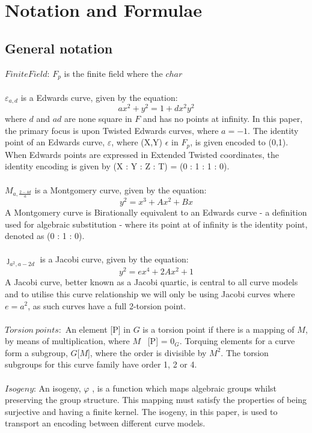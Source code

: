 \documentclass{article}
\begin{document}
\section{Notation and Formulae} 
\subsection{General notation}
$Finite Field$: $F_p$ is the finite field where the $char$ \\\\
$\varepsilon_{a,d}$ is a Edwards curve, given by the equation: $$ {a}x^2+y^2=1+{d}x^2y^2 $$ where {$d$} and {$ad$} are none square in $F$ and has no points at infinity. In this paper, the primary focus is upon Twisted Edwards curves, where $a = -1$. The identity point of an Edwards curve, $\varepsilon$, where (X,Y) $\epsilon$ in $F_p$, is given encoded to (0,1). When Edwards points are expressed in Extended Twisted coordinates, the identity encoding is given by (X : Y : Z : T) = (0 : 1 : 1 : 0).\\\\
${M}_{a,\frac{2-4d}{a}}$ is a Montgomery curve, given by the equation: $$ y^2=x^3+Ax^2+Bx $$ A Montgomery curve is Birationally equivalent to an Edwards curve - a definition used for algebraic substitution -  where its point at of infinity is the identity point, denoted as (0 : 1 : 0).\\\\  
$\jmath_{a^{2},a−2d}$ is a Jacobi curve, given by the equation: $$y
^2 = {e}x^4 + 2Ax^2 + 1$$ A Jacobi curve, better known as a Jacobi quartic, is central to all curve models and to utilise this curve relationship we will only be using Jacobi curves where $e = {a}^2$, as such curves have a full 2-torsion point.\\\\
$Torsion\ points$:\ An element [P] in  $G$ is a torsion point if there is a mapping of $M$, by means of multiplication, where $M$ \cdot\ [P] = $0_{G}$. Torquing elements for a curve form a subgroup, $G$[$M$], where the order is divisible by ${M}^2$. The torsion subgroups for this curve family have order 1, 2 or 4.  \\\\ 
$Isogeny$: An isogeny, $\varphi$ , is a function which maps algebraic groups whilst preserving the group structure. This mapping must satisfy the properties of being surjective and having a finite kernel. The isogeny, in this paper, is used to transport an encoding between different curve models.\\\\
\end{document}
